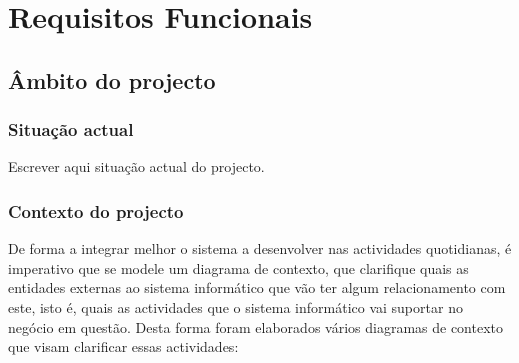 \chapter{Requisitos Funcionais}

\section{Âmbito do projecto}

\subsection{Situação actual}

Escrever aqui situação actual do projecto.

\subsection{Contexto do projecto}

De forma a integrar melhor o sistema a desenvolver nas actividades quotidianas, é imperativo que se modele um diagrama de contexto, que clarifique quais as entidades externas ao sistema informático que vão ter algum relacionamento com este, isto é, quais as actividades que o sistema informático vai suportar no negócio em questão. Desta forma foram elaborados vários diagramas de contexto que visam clarificar essas actividades:

